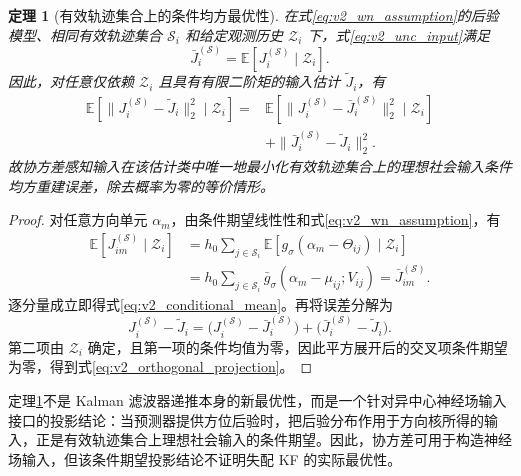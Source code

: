 \documentclass[UTF8,fontset=windows,11pt]{ctexart}
\newtheorem{theorem}{定理}[section]
\newcommand{\E}{\mathbb E}
\begin{document}
\begin{theorem}[有效轨迹集合上的条件均方最优性]
\label{thm:v2_mmse}
在式\eqref{eq:v2_wn_assumption}的后验模型、相同有效轨迹集合 $\mathcal S_i$ 和给定观测历史 $\mathcal Z_i$ 下，式\eqref{eq:v2_unc_input}满足
\begin{equation}
 \bar J_i^{(\mathcal S)}=\E[J_i^{(\mathcal S)}\mid\mathcal Z_i].
 \label{eq:v2_conditional_mean}
\end{equation}
因此，对任意仅依赖 $\mathcal Z_i$ 且具有有限二阶矩的输入估计 $\widetilde J_i$，有
\begin{equation}
 \begin{aligned}
 \E[\|J_i^{(\mathcal S)}-\widetilde J_i\|_2^2\mid\mathcal Z_i]
 ={}&\E[\|J_i^{(\mathcal S)}-\bar J_i^{(\mathcal S)}\|_2^2\mid\mathcal Z_i]\\
 &+\|\bar J_i^{(\mathcal S)}-\widetilde J_i\|_2^2.
 \end{aligned}
 \label{eq:v2_orthogonal_projection}
\end{equation}
故协方差感知输入在该估计类中唯一地最小化有效轨迹集合上的理想社会输入条件均方重建误差，除去概率为零的等价情形。
\end{theorem}

\begin{proof}
对任意方向单元 $\alpha_m$，由条件期望线性性和式\eqref{eq:v2_wn_assumption}，有
\begin{equation}
 \begin{aligned}
 \E[J_{im}^{(\mathcal S)}\mid\mathcal Z_i]
 &=h_0\sum_{j\in\mathcal S_i}
 \E[g_\sigma(\alpha_m-\Theta_{ij})\mid\mathcal Z_i]\\
 &=h_0\sum_{j\in\mathcal S_i}
 \bar g_\sigma(\alpha_m-\mu_{ij};V_{ij})
 =\bar J_{im}^{(\mathcal S)}.
 \end{aligned}
 \label{eq:v2_component_expectation}
\end{equation}
逐分量成立即得式\eqref{eq:v2_conditional_mean}。再将误差分解为
\begin{equation}
 J_i^{(\mathcal S)}-\widetilde J_i
 =\bigl(J_i^{(\mathcal S)}-\bar J_i^{(\mathcal S)}\bigr)
 +\bigl(\bar J_i^{(\mathcal S)}-\widetilde J_i\bigr).
 \label{eq:v2_error_decomposition}
\end{equation}
第二项由 $\mathcal Z_i$ 确定，且第一项的条件均值为零，因此平方展开后的交叉项条件期望为零，得到式\eqref{eq:v2_orthogonal_projection}。
\end{proof}

定理\ref{thm:v2_mmse}不是 Kalman 滤波器递推本身的新最优性，而是一个针对异中心神经场输入接口的投影结论：当预测器提供方位后验时，把后验分布作用于方向核所得的输入，正是有效轨迹集合上理想社会输入的条件期望。因此，协方差可用于构造神经场输入，但该条件期望投影结论不证明失配 KF 的实际最优性。
\end{document}
